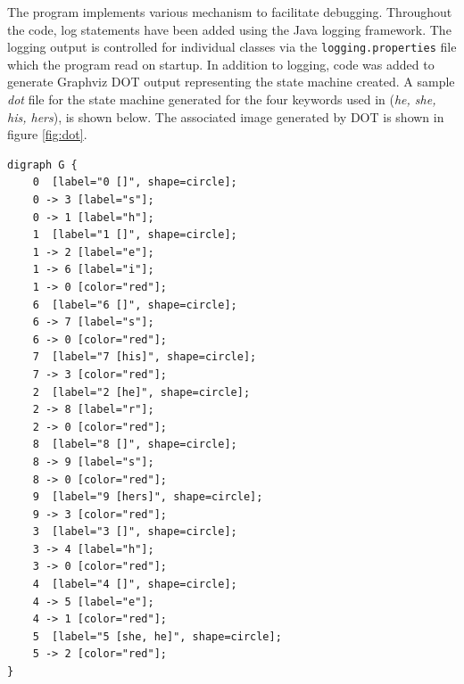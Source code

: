 \documentclass[10pt]{report}
\begin{document}
The program implements various mechanism to facilitate
debugging. Throughout the code, log statements have been added using
the Java logging framework. The logging output is controlled for
individual classes via the \texttt{logging.properties} file which the
program read on startup. In addition to logging, code was added to
generate Graphviz DOT\cite{RefWorks:110} output
representing the state machine created. A sample \textit{dot} file for the state machine generated for the four
keywords used in \cite{RefWorks:103} (\textit{he, she, his, hers}), is
shown below. The associated image generated by DOT is shown in figure
\ref{fig:dot}.


\begin{verbatim}
digraph G {
	0  [label="0 []", shape=circle];
	0 -> 3 [label="s"];
	0 -> 1 [label="h"];
	1  [label="1 []", shape=circle];
	1 -> 2 [label="e"];
	1 -> 6 [label="i"];
	1 -> 0 [color="red"];
	6  [label="6 []", shape=circle];
	6 -> 7 [label="s"];
	6 -> 0 [color="red"];
	7  [label="7 [his]", shape=circle];
	7 -> 3 [color="red"];
	2  [label="2 [he]", shape=circle];
	2 -> 8 [label="r"];
	2 -> 0 [color="red"];
	8  [label="8 []", shape=circle];
	8 -> 9 [label="s"];
	8 -> 0 [color="red"];
	9  [label="9 [hers]", shape=circle];
	9 -> 3 [color="red"];
	3  [label="3 []", shape=circle];
	3 -> 4 [label="h"];
	3 -> 0 [color="red"];
	4  [label="4 []", shape=circle];
	4 -> 5 [label="e"];
	4 -> 1 [color="red"];
	5  [label="5 [she, he]", shape=circle];
	5 -> 2 [color="red"];
}
\end{verbatim}
\end{document}

